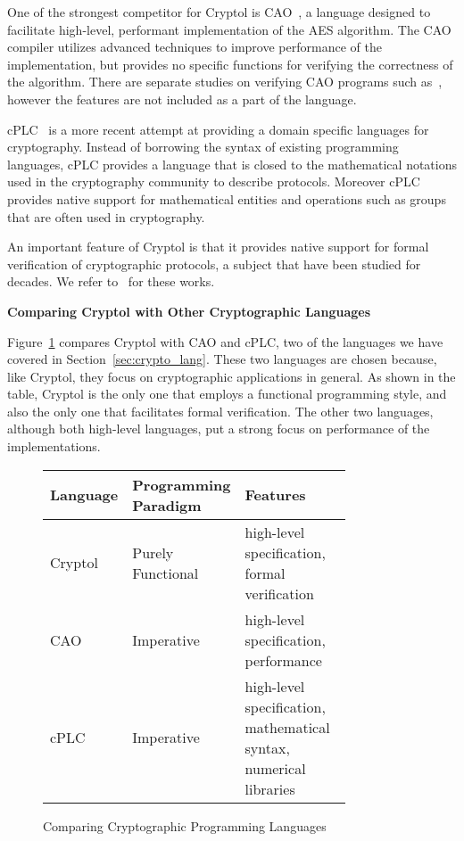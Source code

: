 \documentclass[a4paper, notitlepage]{report}
\renewcommand{\paragraph}[1]{\vspace*{1em}\noindent\textbf{#1}\hspace*{1em}}
\begin{document}
One of the strongest competitor for Cryptol is 
CAO~\cite{moss2010bridging}, a language designed to facilitate high-level,
performant implementation of the AES algorithm. The CAO compiler utilizes
advanced techniques to improve performance of the implementation, but 
provides no specific functions for verifying the correctness of the algorithm.
There are separate studies on verifying CAO programs such as~\cite{barbosa2010deductive},
however the features are not included as a part of the language.

cPLC~\cite{bangerter2011cplc} is a more recent attempt at providing a domain
specific languages for cryptography. Instead of borrowing the syntax of existing
programming languages, cPLC provides a language that is closed to the 
mathematical notations used in the cryptography community to describe 
protocols. Moreover cPLC provides native support for mathematical entities
and operations such as groups that are often used in cryptography.

An important feature of Cryptol is that it provides native support for formal
verification of cryptographic protocols,
a subject that have been studied for decades.
We refer to~\cite{meadows1994formal} for these works.
 

\paragraph{Comparing Cryptol with Other Cryptographic Languages}

Figure~\ref{fig:compare} compares Cryptol with CAO and cPLC, two of the languages we have
covered in Section~\ref{sec:crypto_lang}. These two languages are chosen because,
like Cryptol, they focus on cryptographic applications in general. As shown in the
table, Cryptol is the only one that employs a functional programming style, and
also the only one that facilitates formal verification. The other two languages,
although both high-level languages, put a strong focus on performance of the
implementations.

\begin{figure}
  \begin{center}
    \begin{tabular}{|l | p{0.2\linewidth} | p{0.6\linewidth} |}
      \hline
      Language & Programming Paradigm & Features \\
      \hline
      Cryptol & Purely Functional  & high-level specification, formal verification \\
      \hline
      CAO~\cite{moss2010bridging} & Imperative & high-level specification, performance \\
      \hline
      cPLC~\cite{bangerter2011cplc} & Imperative & high-level specification, mathematical syntax, numerical libraries \\
      \hline
    \end{tabular}
  \end{center}
  \caption{Comparing Cryptographic Programming Languages}
  \label{fig:compare}
\end{figure}
\end{document}
